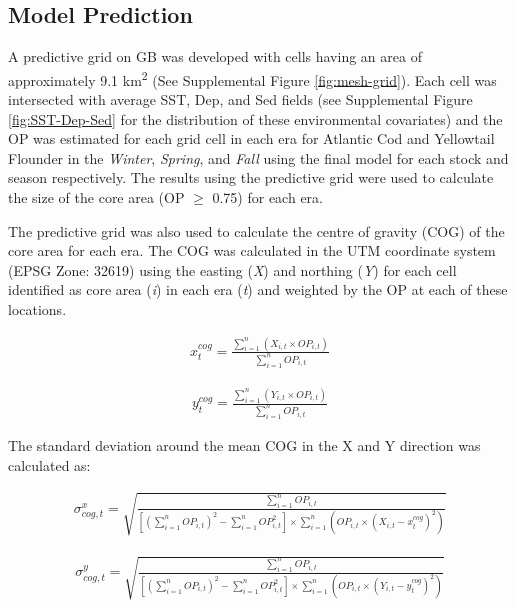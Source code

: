 \documentclass[
]{article}
\begin{document}
\hypertarget{model-prediction}{%
\subsection{Model Prediction}\label{model-prediction}}

A predictive grid on GB was developed with cells having an area of approximately 9.1 km\textsuperscript{2} (See Supplemental Figure \ref{fig:mesh-grid}). Each cell was intersected with average SST, Dep, and Sed fields (see Supplemental Figure \ref{fig:SST-Dep-Sed} for the distribution of these environmental covariates) and the OP was estimated for each grid cell in each era for Atlantic Cod and Yellowtail Flounder in the \emph{Winter}, \emph{Spring}, and \emph{Fall} using the final model for each stock and season respectively. The results using the predictive grid were used to calculate the size of the core area (OP \(\geq\) 0.75) for each era.

The predictive grid was also used to calculate the centre of gravity (COG) of the core area for each era. The COG was calculated in the UTM coordinate system (EPSG Zone: 32619) using the easting (\emph{X}) and northing (\emph{Y}) for each cell identified as core area (\emph{i}) in each era (\emph{t}) and weighted by the OP at each of these locations.

\begin{align} 
x_{t}^{cog} = \frac{\sum_{i=1}^{n} (X_{i,t} \times OP_{i,t})}{\sum_{i=1}^{n}OP_{i,t}} 
\end{align}

\begin{align}
y_{t}^{cog} = \frac{\sum_{i=1}^{n} (Y_{i,t} \times OP_{i,t})}{\sum_{i=1}^{n}OP_{i,t}}
\end{align}

The standard deviation around the mean COG in the X and Y direction was calculated as:

\begin{align}
\sigma_{cog,t}^{x} = \sqrt{\frac{ \sum_{i=1}^{n}OP_{i,t}} { [(\sum_{i=1}^{n}OP_{i,t})^2 - \sum_{i=1}^{n}OP_{i,t}^2] \times \sum_{i=1}^{n} (OP_{i,t}  \times (X_{i,t} - x_{t}^{cog})^2)}} 
\end{align}

\begin{align}
\sigma_{cog,t}^{y} = \sqrt {\frac{ \sum_{i=1}^{n}OP_{i,t}} { [(\sum_{i=1}^{n}OP_{i,t})^2 - \sum_{i=1}^{n}OP_{i,t}^2] \times \sum_{i=1}^{n} (OP_{i,t}  \times (Y_{i,t} - y_{t}^{cog})^2)}} 
\end{align}
\end{document}
